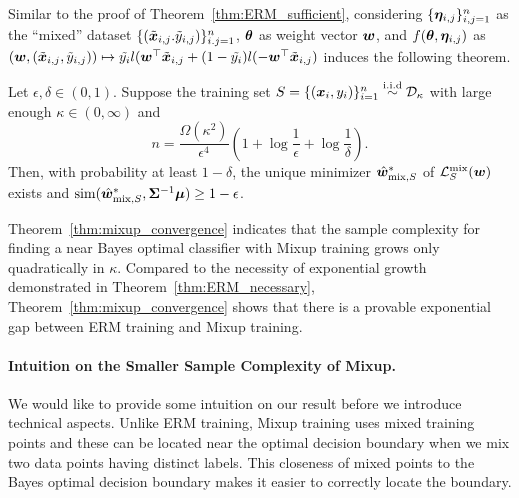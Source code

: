 Similar to the proof of Theorem~\ref{thm:ERM_sufficient}, considering $\{ {\bm{\eta}}_{i,j} \}_{i,j=1}^n$ as the ``mixed'' dataset $\{ (\tilde{{\bm{x}}}_{i,j}. \tilde{y}_{i,j})\}_{i.j=1}^n$, ${\bm{\theta}}$ as weight vector ${\bm{w}}$, and $f({\bm{\theta}}, {\bm{\eta}}_{i,j})$ as $({\bm{w}}, (\tilde{{\bm{x}}}_{i,j}, \tilde{y}_{i,j})) \mapsto \tilde{y_i}l({\bm{w}}^\top \tilde{{\bm{x}}}_{i,j} + (1-\tilde{y_i})l(-{\bm{w}}^\top \tilde{{\bm{x}}}_{i,j})$ induces the following theorem.
\begin{theorem}\label{thm:mixup_convergence}
Let $\epsilon, \delta \in (0,1)$. Suppose the training set $S = \{({\bm{x}}_i, y_i)\}_{i=1}^n\overset{\mathrm{i.i.d}}{\sim} \mathcal{D}_\kappa$ with large enough $\kappa \in (0,\infty)$ and
\begin{equation*}
    n = \frac{\Omega(\kappa^2)}{\epsilon^4}\left (1 + \log \frac{1}{\epsilon} + \log \frac{1}{\delta} \right).
\end{equation*}
Then, with probability at least $1-\delta$, the unique minimizer $\hat{{\bm{w}}}_{\mathrm{mix}, S}^*$ of $\mathcal{L}_S^\mathrm{mix}({\bm{w}})$ exists and $\mathrm{sim}(\hat{{\bm{w}}}_{\mathrm{mix}, S}^*, {\bm{\Sigma}}^{-1}{\bm{\mu}}) \geq 1-\epsilon$.
\end{theorem}
Theorem~\ref{thm:mixup_convergence} indicates that the sample complexity for finding a near Bayes optimal classifier with Mixup training grows only quadratically in $\kappa$. Compared to the necessity of exponential growth demonstrated in Theorem~\ref{thm:ERM_necessary}, Theorem~\ref{thm:mixup_convergence} shows that there is a provable exponential gap between ERM training and Mixup training.
\paragraph{Intuition on the Smaller Sample Complexity of Mixup.}We would like to provide some intuition on our result before we introduce technical aspects. Unlike ERM training, Mixup training uses mixed training points and these can be located near the optimal decision boundary when we mix two data points having distinct labels. This closeness of mixed points to the Bayes optimal decision boundary makes it easier to correctly locate the boundary.
\vspace*{-5pt}
